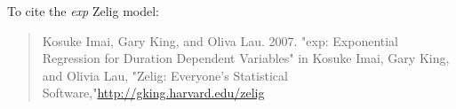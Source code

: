 To cite the \emph{ exp } Zelig model:
 \begin{verse}
 Kosuke Imai, Gary King, and Oliva Lau. 2007. "exp: Exponential Regression for Duration Dependent Variables" in Kosuke Imai, Gary King, and Olivia Lau, "Zelig: Everyone's Statistical Software,"\url{http://gking.harvard.edu/zelig} 
\end{verse}